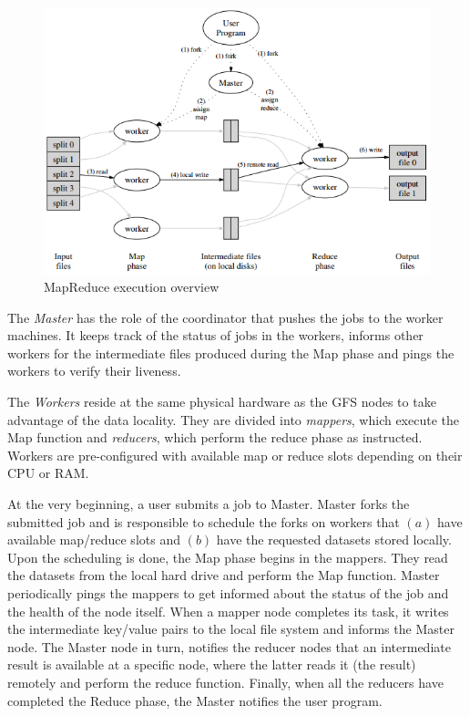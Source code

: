 \begin{figure}
\centering
\includegraphics[scale=0.8]{resources/images/Background/mapreduce_exec_overview.png}
\caption{MapReduce execution overview \cite{Dean:2004:MSD:1251254.1251264}}
\label{fig:mapreduce_execution_overview}
\end{figure}

The \emph{Master} has the role of the coordinator that pushes the jobs
to the worker machines. It keeps track of the status of jobs in the
workers, informs other workers for the intermediate files produced
during the Map phase and pings the workers to verify their liveness.

The \emph{Workers} reside at the same physical hardware as the GFS
nodes to take advantage of the data locality. They are divided into
\emph{mappers}, which execute the Map function and \emph{reducers},
which perform the reduce phase as instructed. Workers are
pre-configured with available map or reduce slots depending on their
CPU or RAM.

At the very beginning, a user submits a job to Master. Master forks
the submitted job and is responsible to schedule the forks on workers
that $(a)$ have available map/reduce slots and $(b)$ have the
requested datasets stored locally. Upon the scheduling is done, the
Map phase begins in the mappers. They read the datasets from the local
hard drive and perform the Map function. Master periodically pings the
mappers to get informed about the status of the job and the health of
the node itself. When a mapper node completes its task, it writes the
intermediate key/value pairs to the local file system and informs the
Master node. The Master node in turn, notifies the reducer nodes that
an intermediate result is available at a specific node, where the
latter reads it (the result) remotely and perform the reduce
function. Finally, when all the reducers have completed the Reduce
phase, the Master notifies the user program.

